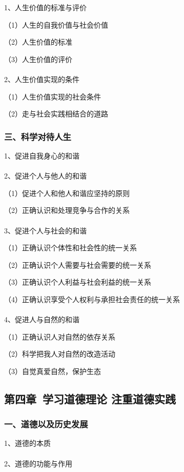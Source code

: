 \documentclass{ctexart}
\begin{document}
1、人生价值的标准与评价

（1）人生的自我价值与社会价值

（2）人生价值的标准

（3）人生价值的评价
\\\\

2、人生价值实现的条件

（1）人生价值实现的社会条件

（2）走与社会实践相结合的道路

\subsubsection{三、科学对待人生}
1、促进自我身心的和谐
\\\\

2、促进个人与他人的和谐

（1）促进个人和他人和谐应坚持的原则

（2）正确认识和处理竞争与合作的关系
\\\\

3、促进个人与社会的和谐

（1）正确认识个体性和社会性的统一关系

（2）正确认识个人需要与社会需要的统一关系

（3）正确认识个人利益与社会利益的统一关系

（4）正确认识享受个人权利与承担社会责任的统一关系
\\\\

4、促进人与自然的和谐

（1）正确认识人对自然的依存关系

（2）科学把我人对自然的改造活动

（3）自觉真爱自然，保护生态


\subsection{第四章\ 学习道德理论 注重道德实践}

\subsubsection{一、道德以及历史发展}
1、道德的本质
\\\\

2、道德的功能与作用
\end{document}
